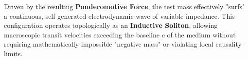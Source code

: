 Driven by the resulting \textbf{Ponderomotive Force}, the test mass effectively "surfs" a continuous, self-generated electrodynamic wave of variable impedance. This configuration operates topologically as an \textbf{Inductive Soliton}, allowing macroscopic transit velocities exceeding the baseline $c$ of the medium without requiring mathematically impossible "negative mass" or violating local causality limits.

